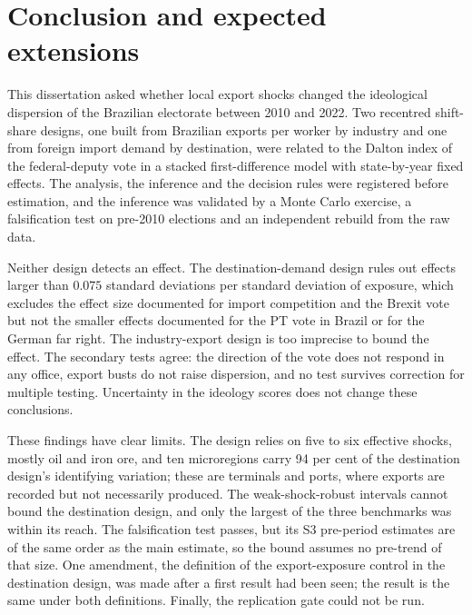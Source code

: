 \documentclass[
	11pt,				%
	oneside,			%
	a4paper,			%
	english,			%
	english				%
	]{abntex2ppgsi}
\theoremstyle{plain}
\theoremstyle{remark}
\theoremstyle{plain}%
\theoremstyle{remark}%
\begin{document}
\chapter{Conclusion and expected extensions}
\label{ch:conclusion}

This dissertation asked whether local export shocks changed the ideological dispersion of the Brazilian electorate between 2010 and 2022. Two recentred shift-share designs, one built from Brazilian exports per worker by industry and one from foreign import demand by destination, were related to the Dalton index of the federal-deputy vote in a stacked first-difference model with state-by-year fixed effects. The analysis, the inference and the decision rules were registered before estimation, and the inference was validated by a Monte Carlo exercise, a falsification test on pre-2010 elections and an independent rebuild from the raw data.

Neither design detects an effect. The destination-demand design rules out effects larger than $0.075$ standard deviations per standard deviation of exposure, which excludes the effect size documented for import competition and the Brexit vote but not the smaller effects documented for the PT vote in Brazil or for the German far right. The industry-export design is too imprecise to bound the effect. The secondary tests agree: the direction of the vote does not respond in any office, export busts do not raise dispersion, and no test survives correction for multiple testing. Uncertainty in the ideology scores does not change these conclusions.

These findings have clear limits. The design relies on five to six effective shocks, mostly oil and iron ore, and ten microregions carry 94 per cent of the destination design's identifying variation; these are terminals and ports, where exports are recorded but not necessarily produced. The weak-shock-robust intervals cannot bound the destination design, and only the largest of the three benchmarks was within its reach. The falsification test passes, but its S3 pre-period estimates are of the same order as the main estimate, so the bound assumes no pre-trend of that size. One amendment, the definition of the export-exposure control in the destination design, was made after a first result had been seen; the result is the same under both definitions. Finally, the replication gate could not be run.
\end{document}
